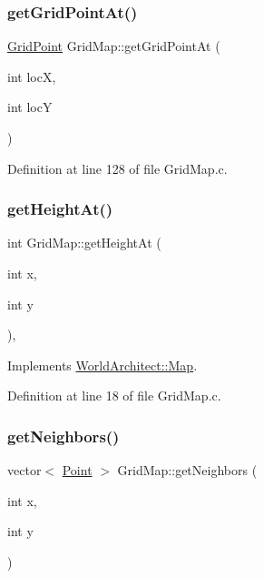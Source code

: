\subsubsection{\texorpdfstring{getGridPointAt()}{getGridPointAt()}}
{\footnotesize\ttfamily \mbox{\hyperlink{struct_world_architect_1_1_grid_point}{Grid\+Point}} Grid\+Map\+::get\+Grid\+Point\+At (\begin{DoxyParamCaption}\item[{int}]{locX,  }\item[{int}]{locY }\end{DoxyParamCaption})}



Definition at line 128 of file Grid\+Map.\+c.

\mbox{\label{class_world_architect_1_1_grid_map_a00b9a9b88ebb3272a1cd2438d1c558ab}} 
\subsubsection{\texorpdfstring{getHeightAt()}{getHeightAt()}}
{\footnotesize\ttfamily int Grid\+Map\+::get\+Height\+At (\begin{DoxyParamCaption}\item[{int}]{x,  }\item[{int}]{y }\end{DoxyParamCaption})\hspace{0.3cm}{\ttfamily [override]}, {\ttfamily [virtual]}}



Implements \mbox{\hyperlink{class_world_architect_1_1_map_ac2f33a10a0d3136515552c171d138ef2}{World\+Architect\+::\+Map}}.



Definition at line 18 of file Grid\+Map.\+c.

\mbox{\label{class_world_architect_1_1_grid_map_a353fd3d5ac4bbfe84450814e0e5336bf}} 
\subsubsection{\texorpdfstring{getNeighbors()}{getNeighbors()}}
{\footnotesize\ttfamily vector$<$ \mbox{\hyperlink{vector_8h_ac82aba4f8f70541442a30f1598bd0649}{Point}} $>$ Grid\+Map\+::get\+Neighbors (\begin{DoxyParamCaption}\item[{int}]{x,  }\item[{int}]{y }\end{DoxyParamCaption})}


